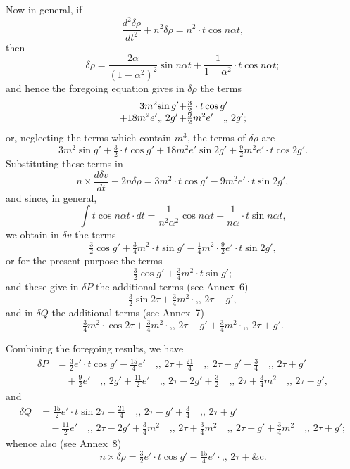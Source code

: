 \documentclass[11pt,a4paper]{book}
\providecommand{\mypar}{\par}
\begin{document}
\mypar
Now in general, if
\[
\frac{d^2\delta\rho}{dt^2} + n^2\delta\rho = n^2 \cdot t\cos n\alpha t,
\]
then
\[
\delta\rho = \frac{2\alpha}{(1-\alpha^2)^2}\sin n\alpha t + \frac{1}{1-\alpha^2} \cdot t\cos n\alpha t;
\]
and hence the foregoing equation gives in $\delta\rho$ the terms
\[
\begin{array}{r@{}l@{}l}
3m^2 & \sin g' & + \tfrac{3}{2} \cdot t\cos g'\\
+ 18m^2e' & \text{,, } 2g' & + \tfrac{9}{2}m^2e' \quad \text{,, } 2g';
\end{array}
\]
or, neglecting the terms which contain $m^3$, the terms of $\delta\rho$ are
\[
3m^2 \sin g' + \tfrac{3}{2} \cdot t\cos g' + 18m^2e' \sin 2g' + \tfrac{9}{2}m^2e' \cdot t\cos 2g'.
\]
Substituting these terms in
\[
n \times \frac{d\delta v}{dt} - 2n\delta\rho = 3m^2 \cdot t\cos g' - 9m^2e' \cdot t\sin 2g',
\]
and since, in general,
\[
\int t\cos n\alpha t \cdot dt = \frac{1}{n^2\alpha^2}\cos n\alpha t + \frac{1}{n\alpha} \cdot t\sin n\alpha t,
\]
we obtain in $\delta v$ the terms
\[
\tfrac{3}{2}\cos g' + \tfrac{3}{4}m^2 \cdot t\sin g'
- \tfrac{1}{4}m^2 \cdot \tfrac{9}{2}e' \cdot t\sin 2g',
\]
or for the present purpose the terms
\[
\tfrac{3}{2}\cos g' + \tfrac{3}{4}m^2 \cdot t\sin g';
\]
and these give in $\delta P$ the additional terms (see Annex~6)
\[
\tfrac{3}{2}\sin 2\tau + \tfrac{3}{4}m^2 \cdot \text{,, } 2\tau - g',
\]
and in $\delta Q$ the additional terms (see Annex~7)
\[
\tfrac{3}{4}m^2 \cdot \cos 2\tau + \tfrac{3}{4}m^2 \cdot \text{,, } 2\tau - g'
+ \tfrac{3}{4}m^2 \cdot \text{,, } 2\tau + g'.
\]

\mypar
Combining the foregoing results, we have
\begin{align*}
\delta P &= \tfrac{3}{2}e' \cdot t\cos g' - \tfrac{15}{4}e' \quad \text{,, } 2\tau
 + \tfrac{21}{4} \quad \text{,, } 2\tau - g'
 - \tfrac{3}{4} \quad \text{,, } 2\tau + g'\\
&\quad + \tfrac{9}{2}e' \quad \text{,, } 2g'
 + \tfrac{11}{2}e' \quad \text{,, } 2\tau - 2g'
 + \tfrac{3}{2} \quad \text{,, } 2\tau
 + \tfrac{3}{4}m^2 \quad \text{,, } 2\tau - g',
\end{align*}
and
\begin{align*}
\delta Q &= \tfrac{15}{2}e' \cdot t\sin 2\tau
 - \tfrac{21}{4} \quad \text{,, } 2\tau - g'
 + \tfrac{3}{4} \quad \text{,, } 2\tau + g'\\
&\quad - \tfrac{11}{2}e' \quad \text{,, } 2\tau - 2g'
 + \tfrac{3}{4}m^2 \quad \text{,, } 2\tau
 + \tfrac{3}{4}m^2 \quad \text{,, } 2\tau - g'
 + \tfrac{3}{4}m^2 \quad \text{,, } 2\tau + g';
\end{align*}
whence also (see Annex~8)
\[
n \times \delta\rho = \tfrac{3}{2}e' \cdot t\cos g' - \tfrac{15}{4}e' \cdot \text{,, } 2\tau
+ \&\mathrm{c}.
\]
\end{document}
